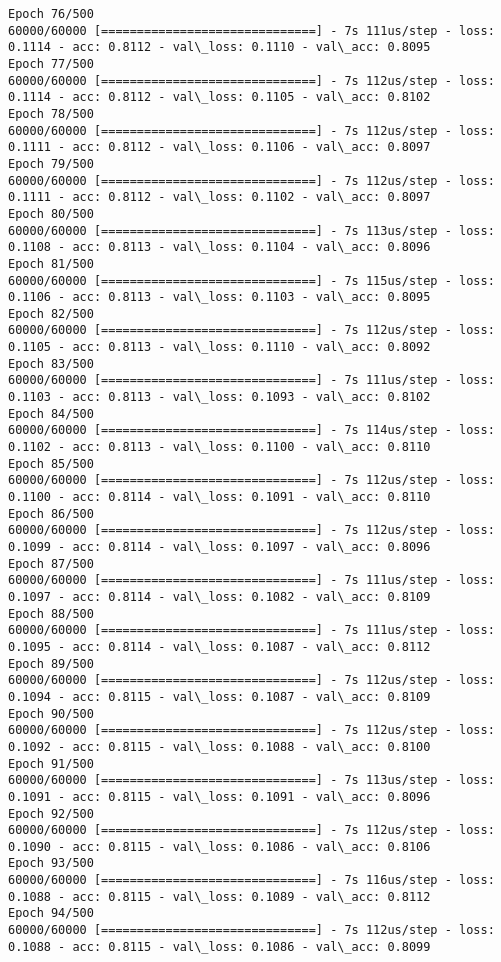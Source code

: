 \documentclass[11pt]{article}
\begin{document}
\begin{Verbatim}[commandchars=\\\{\}]
Epoch 76/500
60000/60000 [==============================] - 7s 111us/step - loss: 0.1114 - acc: 0.8112 - val\_loss: 0.1110 - val\_acc: 0.8095
Epoch 77/500
60000/60000 [==============================] - 7s 112us/step - loss: 0.1114 - acc: 0.8112 - val\_loss: 0.1105 - val\_acc: 0.8102
Epoch 78/500
60000/60000 [==============================] - 7s 112us/step - loss: 0.1111 - acc: 0.8112 - val\_loss: 0.1106 - val\_acc: 0.8097
Epoch 79/500
60000/60000 [==============================] - 7s 112us/step - loss: 0.1111 - acc: 0.8112 - val\_loss: 0.1102 - val\_acc: 0.8097
Epoch 80/500
60000/60000 [==============================] - 7s 113us/step - loss: 0.1108 - acc: 0.8113 - val\_loss: 0.1104 - val\_acc: 0.8096
Epoch 81/500
60000/60000 [==============================] - 7s 115us/step - loss: 0.1106 - acc: 0.8113 - val\_loss: 0.1103 - val\_acc: 0.8095
Epoch 82/500
60000/60000 [==============================] - 7s 112us/step - loss: 0.1105 - acc: 0.8113 - val\_loss: 0.1110 - val\_acc: 0.8092
Epoch 83/500
60000/60000 [==============================] - 7s 111us/step - loss: 0.1103 - acc: 0.8113 - val\_loss: 0.1093 - val\_acc: 0.8102
Epoch 84/500
60000/60000 [==============================] - 7s 114us/step - loss: 0.1102 - acc: 0.8113 - val\_loss: 0.1100 - val\_acc: 0.8110
Epoch 85/500
60000/60000 [==============================] - 7s 112us/step - loss: 0.1100 - acc: 0.8114 - val\_loss: 0.1091 - val\_acc: 0.8110
Epoch 86/500
60000/60000 [==============================] - 7s 112us/step - loss: 0.1099 - acc: 0.8114 - val\_loss: 0.1097 - val\_acc: 0.8096
Epoch 87/500
60000/60000 [==============================] - 7s 111us/step - loss: 0.1097 - acc: 0.8114 - val\_loss: 0.1082 - val\_acc: 0.8109
Epoch 88/500
60000/60000 [==============================] - 7s 111us/step - loss: 0.1095 - acc: 0.8114 - val\_loss: 0.1087 - val\_acc: 0.8112
Epoch 89/500
60000/60000 [==============================] - 7s 112us/step - loss: 0.1094 - acc: 0.8115 - val\_loss: 0.1087 - val\_acc: 0.8109
Epoch 90/500
60000/60000 [==============================] - 7s 112us/step - loss: 0.1092 - acc: 0.8115 - val\_loss: 0.1088 - val\_acc: 0.8100
Epoch 91/500
60000/60000 [==============================] - 7s 113us/step - loss: 0.1091 - acc: 0.8115 - val\_loss: 0.1091 - val\_acc: 0.8096
Epoch 92/500
60000/60000 [==============================] - 7s 112us/step - loss: 0.1090 - acc: 0.8115 - val\_loss: 0.1086 - val\_acc: 0.8106
Epoch 93/500
60000/60000 [==============================] - 7s 116us/step - loss: 0.1088 - acc: 0.8115 - val\_loss: 0.1089 - val\_acc: 0.8112
Epoch 94/500
60000/60000 [==============================] - 7s 112us/step - loss: 0.1088 - acc: 0.8115 - val\_loss: 0.1086 - val\_acc: 0.8099

\end{Verbatim}
\end{document}
